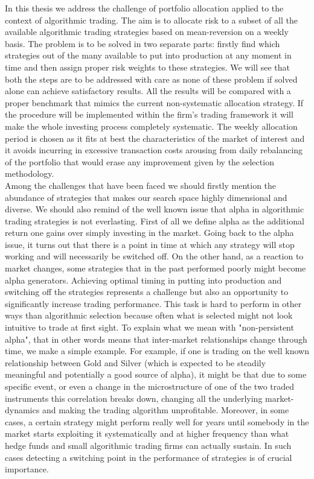 In this thesis we address the challenge of portfolio allocation applied to the context of algorithmic trading. The aim is to allocate risk to a subset of all the available algorithmic trading strategies based on mean-reversion on a weekly basis. The problem is to be solved in two separate parts: firstly find which strategies out of the many available to put into production at any moment in time and then assign proper risk weights to these strategies. We will see that both the steps are to be addressed with care as none of these problem if solved alone can achieve satisfactory results. All the results will be compared with a proper benchmark that mimics the current non-systematic allocation strategy. If the procedure will be implemented within the firm's trading framework it will make the whole investing process completely systematic. The weekly allocation period is chosen as it fits at best the characteristics of the market of interest and it avoids incurring in excessive transaction costs arousing from daily rebalancing of the portfolio that would erase any improvement given by the selection methodology.\\
Among the challenges that have been faced we should firstly mention the abundance of strategies that makes our search space highly dimensional and diverse. We should also remind of the well known issue that alpha in algorithmic trading strategies is not everlasting. First of all we define alpha as the additional return one gains over simply investing in the market. Going back to the alpha issue, it turns out that there is a point in time at which any strategy will stop working and will necessarily be switched off. On the other hand, as a reaction to market changes, some strategies that in the past performed poorly might become alpha generators. Achieving optimal timing in putting into production and switching off the strategies represents a challenge but also an opportunity to significantly increase trading performance. This task is hard to perform in other ways than algorithmic selection because often what is selected might not look intuitive to trade at first sight. To explain what we mean with "non-persistent alpha", that in other words means that inter-market relationships change through time, we make a simple example. For example, if one is trading on the well known relationship between Gold and Silver (which is expected to be steadily meaningful and potentially a good source of alpha), it might be that due to some specific event, or even a change in the microstructure of one of the two traded instruments this correlation breaks down, changing all the underlying market-dynamics and making the trading algorithm unprofitable. Moreover, in some cases, a certain strategy might perform really well for years until somebody in the market starts exploiting it systematically and at higher frequency than what hedge funds and small algorithmic trading firms can actually sustain. In such cases detecting a switching point in the performance of strategies is of crucial importance.\\